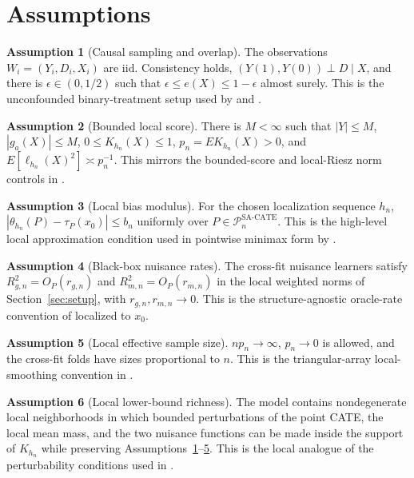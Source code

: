 \documentclass[11pt]{article}
\theoremstyle{definition}
\newtheorem{assumption}{Assumption}
\theoremstyle{plain}
\theoremstyle{remark}
\begin{document}
\section{Assumptions}\label{sec:assumptions}
\begin{assumption}[Causal sampling and overlap]\label{ass:causal}
The observations $W_i=(Y_i,D_i,X_i)$ are iid. Consistency holds, $(Y(1),Y(0))\perp D\mid X$, and there is $\epsilon\in(0,1/2)$ such that $\epsilon\le e(X)\le 1-\epsilon$ almost surely. This is the unconfounded binary-treatment setup used by \citet{ChernozhukovEtAl2018DML} and \citet{Kennedy2023DRCATE}.
\end{assumption}

\begin{assumption}[Bounded local score]\label{ass:bounded}
There is $M<\infty$ such that $|Y|\le M$, $|g_a(X)|\le M$, $0\le K_{h_n}(X)\le 1$, $p_n=E K_{h_n}(X)>0$, and $E[\ell_{h_n}(X)^2]\asymp p_n^{-1}$. This mirrors the bounded-score and local-Riesz norm controls in \citet{ChernozhukovNeweySingh2022LocalRiesz}.
\end{assumption}

\begin{assumption}[Local bias modulus]\label{ass:bias}
For the chosen localization sequence $h_n$, $|\theta_{h_n}(P)-\tau_P(x_0)|\le b_n$ uniformly over $P\in\mathcal{P}_n^{\mathrm{SA\text{-}CATE}}$. This is the high-level local approximation condition used in pointwise minimax form by \citet{KennedyBalakrishnanRobinsWasserman2024MinimaxCATE}.
\end{assumption}

\begin{assumption}[Black-box nuisance rates]\label{ass:nuisance}
The cross-fit nuisance learners satisfy $R_{g,n}^2=O_P(r_{g,n})$ and $R_{m,n}^2=O_P(r_{m,n})$ in the local weighted norms of Section~\ref{sec:setup}, with $r_{g,n},r_{m,n}\to0$. This is the structure-agnostic oracle-rate convention of \citet{JinSyrgkanis2024StructureAgnosticDR} localized to $x_0$.
\end{assumption}

\begin{assumption}[Local effective sample size]\label{ass:effective}
$n p_n\to\infty$, $p_n\to0$ is allowed, and the cross-fit folds have sizes proportional to $n$. This is the triangular-array local-smoothing convention in \citet{KennedyBalakrishnanRobinsWasserman2024MinimaxCATE}.
\end{assumption}

\begin{assumption}[Local lower-bound richness]\label{ass:local-rich}
The model contains nondegenerate local neighborhoods in which bounded perturbations of the point CATE, the local mean mass, and the two nuisance functions can be made inside the support of $K_{h_n}$ while preserving Assumptions~\ref{ass:causal}--\ref{ass:effective}. This is the local analogue of the perturbability conditions used in \citet{JinSyrgkanis2025GeneralLinearFunctionalLowerBounds}.
\end{assumption}
\end{document}
